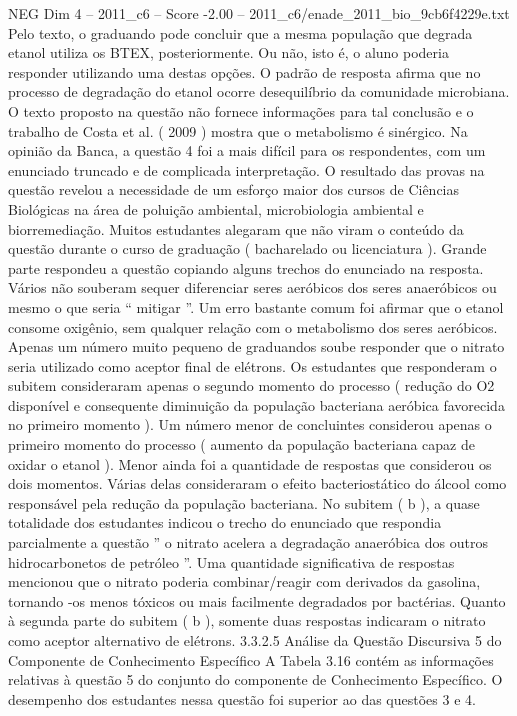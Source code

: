 \begin{textsample}{NEG Dim 4 – 2011\_c6 – Score -2.00 – 2011\_c6/enade\_2011\_bio\_9cb6f4229e.txt}
Pelo texto, o graduando pode concluir que a mesma população que degrada etanol utiliza os BTEX, posteriormente.
Ou não, isto é, o aluno poderia responder utilizando uma destas opções.
O padrão de resposta afirma que no processo de degradação do etanol ocorre desequilíbrio da comunidade microbiana.
O texto proposto na questão não fornece informações para tal conclusão e o trabalho de Costa et al. ( 2009 ) mostra que o metabolismo é sinérgico.
Na opinião da Banca, a questão 4 foi a mais difícil para os respondentes, com um enunciado truncado e de complicada interpretação.
O resultado das provas na questão revelou a necessidade de um esforço maior dos cursos de Ciências Biológicas na área de poluição ambiental, microbiologia ambiental e biorremediação.
Muitos estudantes alegaram que não viram o conteúdo da questão durante o curso de graduação ( bacharelado ou licenciatura ).
Grande parte respondeu a questão copiando alguns trechos do enunciado na resposta.
Vários não souberam sequer diferenciar seres aeróbicos dos seres anaeróbicos ou mesmo o que seria “ mitigar ”.
Um erro bastante comum foi afirmar que o etanol consome oxigênio, sem qualquer relação com o metabolismo dos seres aeróbicos.
Apenas um número muito pequeno de graduandos soube responder que o nitrato seria utilizado como aceptor final de elétrons.
Os estudantes que responderam o subitem consideraram apenas o segundo momento do processo ( redução do O2 disponível e consequente diminuição da população bacteriana aeróbica favorecida no primeiro momento ).
Um número menor de concluintes considerou apenas o primeiro momento do processo ( aumento da população bacteriana capaz de oxidar o etanol ).
Menor ainda foi a quantidade de respostas que considerou os dois momentos.
Várias delas consideraram o efeito bacteriostático do álcool como responsável pela redução da população bacteriana.
No subitem ( b ), a quase totalidade dos estudantes indicou o trecho do enunciado que respondia parcialmente a questão ” o nitrato acelera a degradação anaeróbica dos outros hidrocarbonetos de petróleo ”.
Uma quantidade significativa de respostas mencionou que o nitrato poderia combinar/reagir com derivados da gasolina, tornando -os menos tóxicos ou mais facilmente degradados por bactérias.
Quanto à segunda parte do subitem ( b ), somente duas respostas indicaram o nitrato como aceptor alternativo de elétrons. 3.3.2.5 Análise da Questão Discursiva 5 do Componente de Conhecimento Específico A Tabela 3.16 contém as informações relativas à questão 5 do conjunto do componente de Conhecimento Específico.
O desempenho dos estudantes nessa questão foi superior ao das questões 3 e 4.

\end{textsample}

